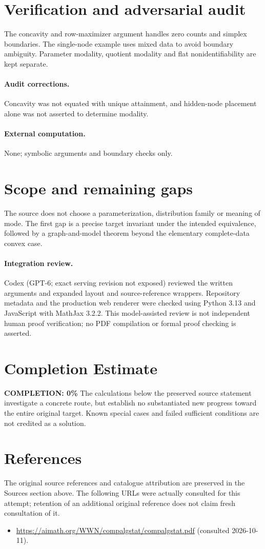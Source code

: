 \documentclass[11pt]{article}
\begin{document}
\section{Verification and adversarial audit}
The concavity and row-maximizer argument handles zero counts and simplex
boundaries. The single-node example uses mixed data to avoid boundary ambiguity.
Parameter modality, quotient modality and flat nonidentifiability are kept
separate.
\paragraph{Audit corrections.} Concavity was not equated with unique attainment, and hidden-node placement alone was not asserted to determine modality.
\paragraph{External computation.} None; symbolic arguments and boundary checks only.
\section{Scope and remaining gaps}
The source does not choose a parameterization, distribution family or
meaning of mode. The first gap is a precise target invariant under the intended
equivalence, followed by a graph-and-model theorem beyond the elementary
complete-data convex case.
\paragraph{Integration review.} Codex (GPT-6; exact serving revision not exposed) reviewed the written arguments and expanded layout and source-reference wrappers. Repository metadata and the production web renderer were checked using Python 3.13 and JavaScript with MathJax 3.2.2. This model-assisted review is not independent human proof verification; no PDF compilation or formal proof checking is asserted.

\section{Completion Estimate}
\noindent\textbf{COMPLETION: 0\%}
The calculations below the preserved source statement investigate a concrete route,
but establish no substantiated new progress toward the entire original target.
Known special cases and failed sufficient conditions are not credited as a solution.
\section{References}
The original source references and catalogue attribution are preserved in the
Sources section above. The following URLs were actually consulted for this attempt;
retention of an additional original reference does not claim fresh consultation of it.
\begin{itemize}
\item \url{https://aimath.org/WWN/compalgstat/compalgstat.pdf} (consulted 2026-10-11). 
\end{itemize}
\end{document}
